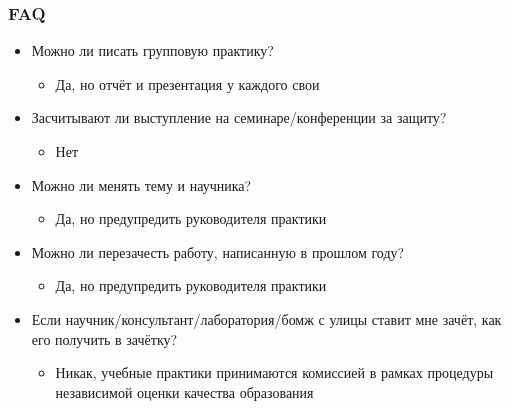 \documentclass{../../slides-style}
\begin{document}
    \begin{frame}
        \frametitle{FAQ}
        \begin{itemize}
            \item Можно ли писать групповую практику?
            \begin{itemize}
                \item Да, но отчёт и презентация у каждого свои
            \end{itemize}
            \item Засчитывают ли выступление на семинаре/конференции за защиту?
            \begin{itemize}
                \item Нет
            \end{itemize}
            \item Можно ли менять тему и научника?
            \begin{itemize}
                \item Да, но предупредить руководителя практики
            \end{itemize}
            \item Можно ли перезачесть работу, написанную в прошлом году?
            \begin{itemize}
                \item Да, но предупредить руководителя практики
            \end{itemize}
            \item Если научник/консультант/лаборатория/бомж с улицы ставит мне зачёт, как его получить в зачётку?
            \begin{itemize}
                \item Никак, учебные практики принимаются комиссией в рамках процедуры независимой оценки качества образования
            \end{itemize}
        \end{itemize}
    \end{frame}
\end{document}
